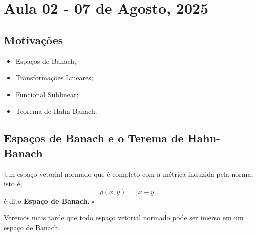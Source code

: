 \documentclass[../functional_analysis.tex]{subfiles}
\begin{document}
\section{Aula 02 - 07 de Agosto, 2025}
\subsection{Motivações}
\begin{itemize}
 \item Espaços de Banach;
 \item Transformações Lineares;
 \item Funcional Sublinear;
 \item Teorema de Hahn-Banach.
\end{itemize}
\subsection{Espaços de Banach e o Terema de Hahn-Banach}
 \begin{def*}
   Um espaço vetorial normado que é completo com a métrica induzida pela norma, isto é, 
     \[
       \rho (x, y) = \Vert x-y \Vert,
     \]
     é dito \textbf{Espaço de Banach.} \(\square\)
 \end{def*}
 Veremos mais tarde que todo espaço vetorial normado pode ser imerso em um espaço de Banach.
\end{document}
